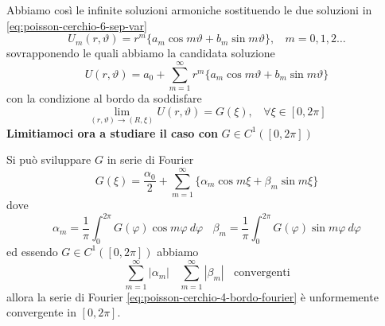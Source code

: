 \documentclass[10pt,a4paper,twoside,openright]{book}
\begin{document}
\begin{dimostrazione}
Abbiamo così le infinite soluzioni armoniche sostituendo le due soluzioni in \eqref{eq:poisson-cerchio-6-sep-var}
\begin{equation*}
U_{m}(r,\vartheta) =r^{m}\{a_{m}\cos m\vartheta +b_{m}\sin m\vartheta \},\ \ \ \ m=0,1,2\dotsc 
\end{equation*}
sovrapponendo le quali abbiamo la candidata soluzione
\begin{equation}
U(r,\vartheta) =a_{0} +\sum\limits ^{\infty }_{m=1} r^{m}\{a_{m}\cos m\vartheta +b_{m}\sin m\vartheta \}
\label{eq:poisson-cerchio-3-candidata}
\end{equation}
con la condizione al bordo da soddisfare
\begin{equation}
\lim _{(r,\vartheta)\rightarrow (R,\xi)} U(r,\vartheta) =G(\xi),\ \ \ \ \forall \xi \in [ 0,2\pi ]
\label{eq:poisson-cerchio-2-condizione}
\end{equation}
\textbf{Limitiamoci ora a studiare il caso con }$G\in C^{1}([ 0,2\pi ])$

Si può sviluppare $G$ in serie di Fourier
\begin{equation}
G(\xi) =\frac{\alpha _{0}}{2} +\sum\limits ^{\infty }_{m=1}\{\alpha _{m}\cos m\xi +\beta _{m}\sin m\xi \} \tag{F}
\label{eq:poisson-cerchio-4-bordo-fourier}
\end{equation}
dove
\begin{equation*}
\alpha _{m} =\frac{1}{\pi }\int ^{2\pi }_{0} G(\varphi)\cos m\varphi \ d\varphi \ \ \ \ \beta _{m} =\frac{1}{\pi }\int ^{2\pi }_{0} G(\varphi)\sin m\varphi \ d\varphi 
\end{equation*}
ed essendo $G\in C^{1}([ 0,2\pi ])$ abbiamo
\begin{equation*}
\sum\limits ^{\infty }_{m=1}| \alpha _{m}| \ \ \ \ \sum\limits ^{\infty }_{m=1}| \beta _{m}| \ \ \ \ \text{convergenti}
\end{equation*}
allora la serie di Fourier \eqref{eq:poisson-cerchio-4-bordo-fourier} è unformemente convergente in $[ 0,2\pi ]$.


\end{dimostrazione}
\end{document}

